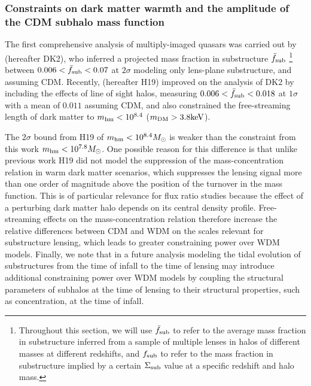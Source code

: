 \subsubsection{Constraints on dark matter warmth and the amplitude of the CDM subhalo mass function}
The first comprehensive analysis of multiply-imaged quasars was carried out by \citet{D+K02} (hereafter DK2), who inferred a projected mass fraction in substructure ${\bar{f}_{\rm{sub}}}$ \footnote{Throughout this section, we will use ${\bar{f}_{\rm{sub}}}$ to refer to the average mass fraction in substructure inferred from a sample of multiple lenses in halos of different masses at different redshifts, and ${{f}_{\rm{sub}}}$ to refer to the mass fraction in substructure implied by a certain $\Sigma_{\rm{sub}}$ value at a specific redshift and halo mass.} between $0.006 < {\bar{f}_{\rm{sub}}} < 0.07$ at $2 \sigma$ modeling only lens-plane substructure, and assuming CDM. Recently, \citet{Hsueh++19} (hereafter H19) improved on the analysis of DK2 by including the effects of line of sight halos, measuring $0.006 < {\bar{f}_{\rm{sub}}} < 0.018$ at $1 \sigma$ with a mean of $0.011$ assuming CDM, and also constrained the free-streaming length of dark matter to ${m_{\rm{hm}}} < 10^{8.4}$ ($m_{\rm{DM}} > 3.8 \rm{keV}$). 

The $2 \sigma$ bound from H19 of ${m_{\rm{hm}}} < 10^{8.4} {M_{\odot}}$ is weaker than the constraint from this work ${m_{\rm{hm}}} < 10^{7.8}{M_{\odot}}$. One possible reason for this difference is that unlike previous work \citep{Birrer++17a,Gilman++18,Gilman++19} H19 did not model the suppression of the mass-concentration relation in warm dark matter scenarios, which suppresses the lensing signal more than one order of magnitude above the position of the turnover in the mass function. This is of particular relevance for flux ratio studies because the effect of a perturbing dark matter halo depends on its central density profile. Free-streaming effects on the mass-concentration relation therefore increase the relative differences between CDM and WDM on the scales relevant for substructure lensing, which leads to greater constraining power over WDM models. Finally, we note that in a future analysis modeling the tidal evolution of substructures from the time of infall to the time of lensing may introduce additional constraining power over WDM models by coupling the structural parameters of subhalos at the time of lensing to their structural properties, such as concentration, at the time of infall.

